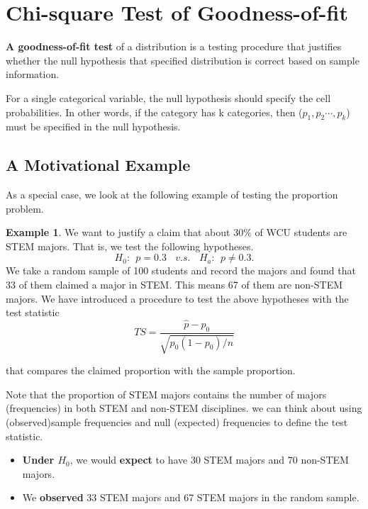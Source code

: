 \documentclass[
]{book}
\begin{document}
\hypertarget{chi-square-test-of-goodness-of-fit}{%
\section{Chi-square Test of Goodness-of-fit}\label{chi-square-test-of-goodness-of-fit}}

\textbf{A goodness-of-fit test} of a distribution is a testing procedure that justifies whether the null hypothesis that specified distribution is correct based on sample information.

For a single categorical variable, the null hypothesis should specify the cell probabilities. In other words, if the category has k categories, then (\(p_1, p_2 \cdots, p_k\)) must be specified in the null hypothesis.

\hypertarget{a-motivational-example}{%
\subsection{A Motivational Example}\label{a-motivational-example}}

As a special case, we look at the following example of testing the proportion problem.

\textbf{Example 1}. We want to justify a claim that about 30\% of WCU students are STEM majors. That is, we test the following hypotheses.
\[
H_0: \  \ p = 0.3 \ \ \ \ v.s. \ \ \ \ H_a: \ \ p \ne 0.3.
\]
We take a random sample of 100 students and record the majors and found that 33 of them claimed a major in STEM. This means 67 of them are non-STEM majors. We have introduced a procedure to test the above hypotheses with the test statistic
\[
TS = \frac{\hat{p}-p_0}{\sqrt{p_0(1-p_0)/n}}
\]

that compares the claimed proportion with the sample proportion.

Note that the proportion of STEM majors contains the number of majors (frequencies) in both STEM and non-STEM disciplines. we can think about using (observed)sample frequencies and null (expected) frequencies to define the test statistic.

\begin{itemize}
\item
  \textbf{Under \(H_0\)}, we would \textbf{expect} to have 30 STEM majors and 70 non-STEM majors.
\item
  We \textbf{observed} 33 STEM majors and 67 STEM majors in the random sample.
\end{itemize}
\end{document}
